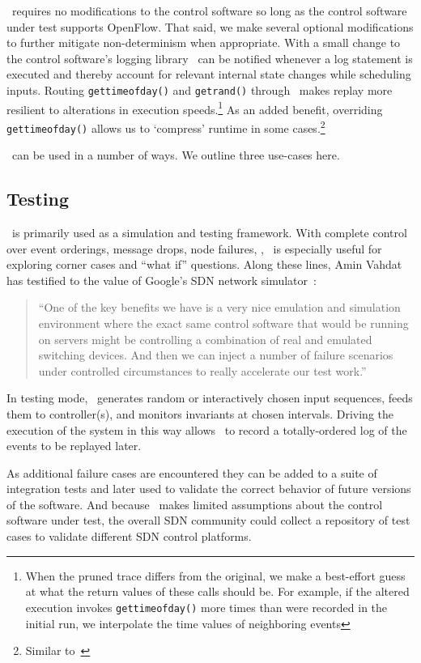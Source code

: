 \projectname~requires
no modifications to the control software so long as the control software under test supports OpenFlow.
That said, we make several optional
modifications to further mitigate non-determinism when appropriate. With a
small change to the control software's logging library \projectname~can be
notified whenever a log statement is executed
and thereby account for relevant internal state changes while scheduling inputs.
Routing {\tt gettimeofday()} and {\tt getrand()} through
\projectname~makes replay more resilient to alterations in execution
speeds.\footnote{When the pruned trace differs from the original, we make a
best-effort guess at what the return values of these calls should be. For example,
if the altered execution invokes {\tt gettimeofday()} more times than were recorded
in the initial run, we interpolate the time values of neighboring events}
As an added benefit, overriding {\tt gettimeofday()} allows us to `compress'
runtime in some cases.\footnote{Similar to~\cite{Gupta06toinfinity}}

\projectname~can be used in a number of ways. We outline three use-cases here.

\subsection{Testing}

\projectname~is primarily used as a simulation and testing framework.
With complete control over event orderings, message drops, node
failures, \etc, \projectname~is especially useful for exploring corner cases
and ``what if'' questions. Along these lines, Amin Vahdat
has testified to the value of Google's SDN network simulator~\cite{vadhat}:
\begin{quote}
``One of the key benefits we have is a very nice emulation and
simulation environment where the exact same control software that would be
running on servers might be controlling a combination of real and emulated
switching devices. And then we can inject a number of failure scenarios under
controlled circumstances to really accelerate our test work.''
\end{quote}

In testing mode, \projectname~generates random or interactively chosen input
sequences, feeds them to controller(s), and monitors invariants at chosen
intervals. Driving the
execution of the system in this way allows \projectname~to record a
totally-ordered log of the events to be replayed later.

As additional failure cases are encountered they can be added
to a suite of integration tests and later used to validate the correct
behavior of future versions of the software. And because \projectname~makes
limited assumptions about the control software under test, the overall SDN community
could collect a repository of test cases to validate different SDN control platforms.


